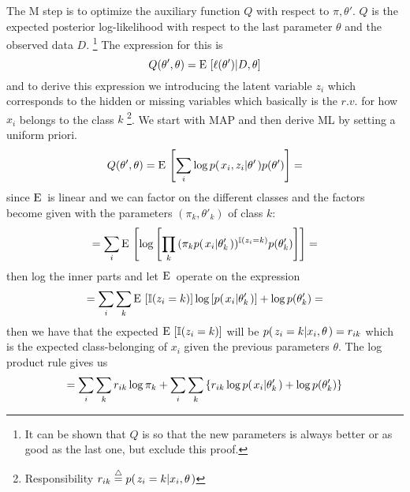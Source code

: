 \documentclass[a4paper,twoside=false,abstract=false,numbers=noenddot,
titlepage=false,headings=small,parskip=half,version=last]{scrartcl}
\begin{document}
\begin{solution}
    The M step is to optimize the auxiliary function $Q$ with respect to
    $\pi,\theta'$. $Q$ is the expected posterior log-likelihood with respect 
    to the last  parameter $\theta$ and the observed data $D$. 
    \footnote{It can be shown that $Q$ is so that the new parameters is always
    better or as good as the last one, but exclude this proof.}
    The expression for this is
    \begin{equation}
        Q(\theta', \theta) = {\rm E}\,\left[\ell(\theta')|D,\theta\right]
    \end{equation}
    and to derive this expression 
    we introducing the latent variable $z_i$ which corresponds to the
    hidden or missing
    variables which basically is the $r.v.$ for how $x_i$
    belongs to the class $k$ \footnote{Responsibility $r_{ik}\eqdef
    \cprob{z_i=k}{x_i,\theta}$}.
    We start with MAP and then derive ML by setting a uniform priori.
    \begin{equation}
       Q(\theta', \theta) = 
       {\rm E}\,\left[\sum\limits_i\log
       p{(\left. x_i,z_i \middle\vert \theta' \right.)}p{(\theta')}\right] =
    \end{equation}
    since ${\rm E}\,$ is linear and we can factor on the different classes and
    the factors become given with the parameters $(\pi_k,\theta'_k)$ of class $k$:
    \begin{equation}
       =\sum\limits_i{\rm E}\, \left[ 
            \log\left[
                \prod\limits_k{(
                    \pi_kp{(\left. x_i \middle\vert \theta'_k \right.)}
                )^{\mathbb{I}(z_i=k)}}
                p{(\theta'_k)}
            \right]
        \right] = 
    \end{equation}
    then log the inner parts and let ${\rm E}\,$ operate on the expression 
    \begin{equation}
        =\sum\limits_i\sum\limits_k{\rm E}\,
            \left[
                \mathbb{I}(z_i=k)
            \right]
            \log\left[
                p{(\left. x_i \middle\vert \theta'_k \right.)}
            \right] + \log p{(\theta'_k)} = 
    \end{equation}
    then we have that the expected ${\rm E}\,\left[\mathbb{I}(z_i=k)\right]$ will be
    $p{(\left. z_i=k \middle\vert x_i,\theta \right.)}=r_{ik}$ which is the expected class-belonging of
    $x_i$ given the previous parameters $\theta$.
    The log product rule gives us
    \begin{equation}
        = \sum\limits_i \sum\limits_k {r_{ik}\log \pi_k} +
        \sum\limits_i \sum\limits_k \left\{ r_{ik} \log p{(\left. x_i \middle\vert \theta'_k \right.)} +
        \log p{(\theta'_k)}
        \right\}
    \end{equation}
    

\end{solution}
\end{document}
